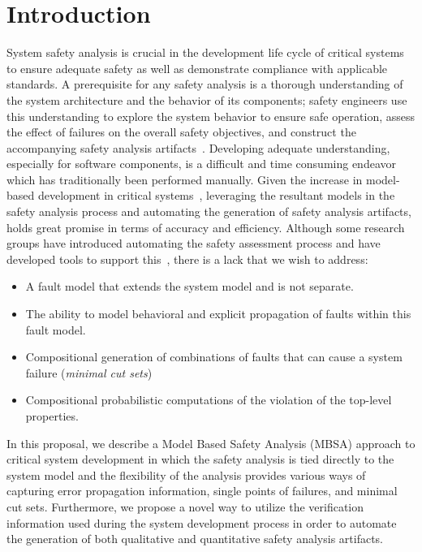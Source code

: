 \chapter{Introduction}
\label{chap:intro}

System safety analysis is crucial in the development life cycle of critical systems to ensure adequate safety as well as demonstrate compliance with applicable standards. A prerequisite for any safety analysis is a thorough understanding of the system architecture and the behavior of its components; safety engineers use this understanding to explore the system behavior to ensure safe operation, assess the effect of failures on the overall safety objectives, and construct the accompanying safety analysis artifacts~\cite{SAE:ARP4761,SAE:ARP4754A}. Developing adequate understanding, especially for software components, is a difficult and time consuming endeavor which has traditionally been performed manually. Given the increase in model-based development in critical systems~\cite{Joshi05:Dasc,CAV2015:BoCiGrMa,info17:HaLuHo,5979344,Gudemann:2010:FQQ:1909626.1909813}, leveraging the resultant models in the safety analysis process and automating the generation of safety analysis artifacts, holds great promise in terms of accuracy and efficiency. Although some research groups have introduced automating the safety assessment process and have developed tools to support this~\cite{Joshi05:SafeComp,CAV2015:BoCiGrMa,10.1007/978-3-319-11936-6-7}, there is a lack that we wish to address: 
\begin{itemize}
\item A fault model that extends the system model and is not separate.
\item The ability to model behavioral and explicit propagation of faults within this fault model.
\item Compositional generation of combinations of faults that can cause a system failure (\textit{minimal cut sets})
\item Compositional probabilistic computations of the violation of the top-level properties.
\end{itemize}

In this proposal, we describe a Model Based Safety Analysis (MBSA) approach to critical system development in which the safety analysis is tied directly to the system model and the flexibility of the analysis provides various ways of capturing error propagation information, single points of failures, and minimal cut sets. Furthermore, we propose a novel way to utilize the verification information used during the system development process in order to automate the generation of both qualitative and quantitative safety analysis artifacts. 

